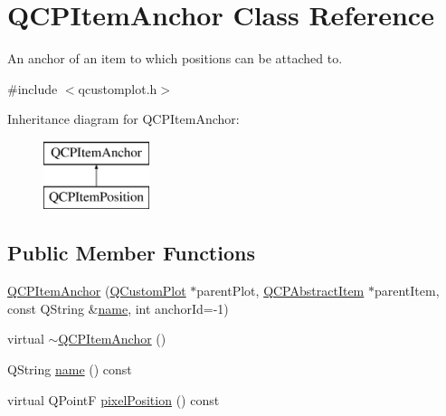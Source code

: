 \hypertarget{class_q_c_p_item_anchor}{}\section{Q\+C\+P\+Item\+Anchor Class Reference}
\label{class_q_c_p_item_anchor}


An anchor of an item to which positions can be attached to.  




{\ttfamily \#include $<$qcustomplot.\+h$>$}

Inheritance diagram for Q\+C\+P\+Item\+Anchor\+:\begin{figure}[H]
\begin{center}
\leavevmode
\includegraphics[height=2.000000cm]{d4/d7c/class_q_c_p_item_anchor}
\end{center}
\end{figure}
\subsection*{Public Member Functions}
\begin{DoxyCompactItemize}
\item 
\mbox{\hyperlink{class_q_c_p_item_anchor_a32573023c6fa65b4496f1f995e5bfa5f}{Q\+C\+P\+Item\+Anchor}} (\mbox{\hyperlink{class_q_custom_plot}{Q\+Custom\+Plot}} $\ast$parent\+Plot, \mbox{\hyperlink{class_q_c_p_abstract_item}{Q\+C\+P\+Abstract\+Item}} $\ast$parent\+Item, const Q\+String \&\mbox{\hyperlink{class_q_c_p_item_anchor_aad37cdf5a3f63428f61be739014e212e}{name}}, int anchor\+Id=-\/1)
\item 
virtual \mbox{\hyperlink{class_q_c_p_item_anchor_a1868559407600688ee4d1a4621e81ceb}{$\sim$\+Q\+C\+P\+Item\+Anchor}} ()
\item 
Q\+String \mbox{\hyperlink{class_q_c_p_item_anchor_aad37cdf5a3f63428f61be739014e212e}{name}} () const
\item 
virtual Q\+PointF \mbox{\hyperlink{class_q_c_p_item_anchor_a06dcfb7220d26eee93eef56ae66582cb}{pixel\+Position}} () const
\end{DoxyCompactItemize}
